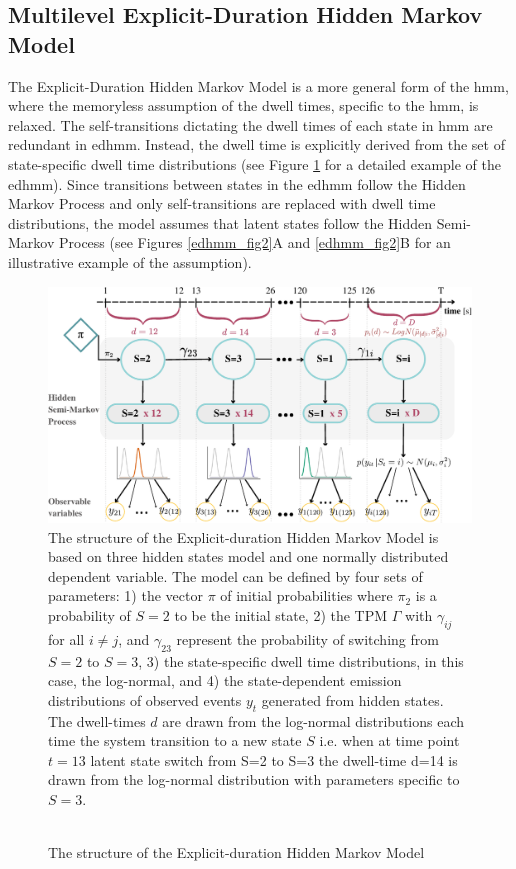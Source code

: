 \subsection{Multilevel Explicit-Duration Hidden Markov Model}

The Explicit-Duration Hidden Markov Model  \citep[EDHMM;][]{freguson1980variable} is a more general form of the \ac{hmm}, where the memoryless assumption of the dwell times, specific to the \ac{hmm}, is relaxed. The self-transitions dictating the dwell times of each state in \ac{hmm} are redundant in \ac{edhmm}. Instead, the dwell time is explicitly derived from the set of state-specific dwell time distributions (see Figure \ref{edhmm_fig} for a detailed example of the \ac{edhmm}). Since transitions between states in the \ac{edhmm} follow the Hidden Markov Process and only self-transitions are replaced with dwell time distributions, the model assumes that latent states follow the Hidden Semi-Markov Process (see Figures \ref{edhmm_fig2}A and \ref{edhmm_fig2}B for an illustrative example of the assumption). 
\begin{figure}[]
\caption{\\The structure of the Explicit-duration Hidden Markov Model} 
\includegraphics[width=\textwidth]{graphics/time_ed2.pdf}
 \flushleft
 \footnotesize
 \justifying
 The structure of the Explicit-duration Hidden Markov Model is based on three hidden states model and one normally distributed dependent variable. The model can be defined by four sets of parameters: 1) the vector $\pi$ of initial probabilities where $\pi_2$ is a probability of $S=2$ to be the initial state, 2) the TPM $\Gamma$ with $\gamma_{ij}$ for all $i\neq j$, and $\gamma_{23}$ represent the probability of switching from $S=2$ to $S=3$, 3) the state-specific dwell time distributions, in this case, the log-normal, and 4) the state-dependent emission distributions of observed events $y_t$ generated from hidden states. The dwell-times $d$ are drawn from the log-normal distributions each time the system transition to a new state $S$ i.e. when at time point $t=13$ latent state switch from S=2 to S=3 the dwell-time d=14 is drawn from the log-normal distribution with parameters specific to $S=3$. 
\label{edhmm_fig}
\end{figure}

